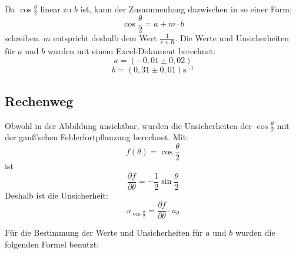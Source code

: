 \documentclass[11pt,a4paper]{article}
\begin{document}
Da $\cos{\frac{\theta}{2}}$ linear zu $b$ ist, kann der Zusammenhang dazwischen in so einer Form:
$$ \cos{\frac{\theta}{2}} = a+m\cdot b$$
schreiben. $m$ entspricht deshalb dem Wert $\frac{1}{r+R}$. Die Werte und Unsicherheiten für $a$ und $b$ wurden mit einem Excel-Dokument berechnet:
$$ a = (-0,01 \pm 0,02) $$
$$ b = (0,31 \pm 0,01) \textrm{s}^{-1} $$

\begin{tcolorbox}[colback=white]
\subsection{Rechenweg}
Obwohl in der Abbildung unsichtbar, wurden die Unsicherheiten der $\cos{\frac{\theta}{2}}$ mit der gauß'schen Fehlerfortpflanzung berechnet. 
Mit:
$$f(\theta) = \cos\frac{\theta}{2}$$
ist
$$\frac{\partial f}{\partial \theta} = -\frac{1}{2}\sin\frac{\theta}{2}$$
Deshalb ist die Unsicherheit:
$$u_{\cos\frac{\theta}{2}} = \frac{\partial f}{\partial \theta}\cdot u_\theta$$

Für die Bestimmung der Werte und Unsicherheiten für $a$ und $b$ wurden die folgenden Formel benutzt:

	
\end{tcolorbox}
\end{document}

